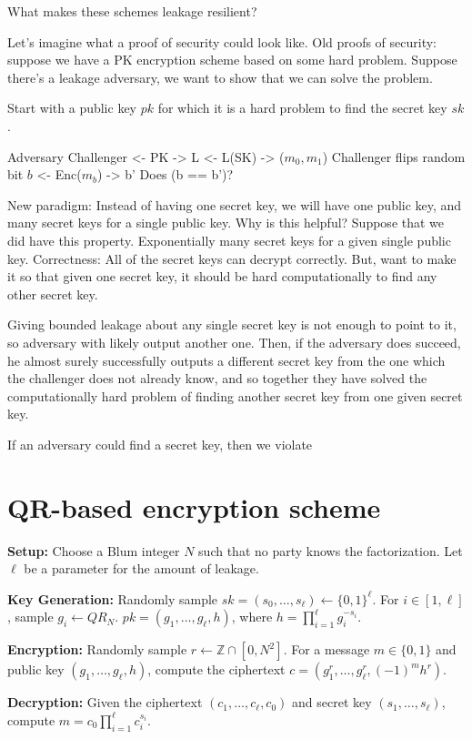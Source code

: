 \documentclass[10pt]{article}
\begin{document}
What makes these schemes leakage resilient?

Let's imagine what a proof of security could look like. Old proofs of security: suppose we have a PK encryption scheme based on some hard problem. Suppose there's a leakage adversary, we want to show that we can solve the problem.

Start with a public key $pk$ for which it is a hard problem to find the secret key $sk$.

Adversary            Challenger
<- PK
-> L
<- L(SK)
-> ($m_0, m_1$)
Challenger flips random bit $b$
<- Enc($m_b$)
-> b'
Does (b == b')?

New paradigm: Instead of having one secret key, we will have one public key, and many secret keys for a single public key. Why is this helpful? Suppose that we did have this property. Exponentially many secret keys for a given single public key. Correctness: All of the secret keys can decrypt correctly. But, want to make it so that given one secret key, it should be hard computationally to find any other secret key.

Giving bounded leakage about any single secret key is not enough to point to it, so adversary with likely output another one. Then, if the adversary does succeed, he almost surely successfully outputs a different secret key from the one which the challenger does not already know, and so together they have solved the computationally hard problem of finding another secret key from one given secret key.

If an adversary could find a secret key, then we violate

\section{QR-based encryption scheme}


\textbf{Setup:} Choose a Blum integer $N$ such that no party knows the factorization. Let $\ell$ be a parameter for the amount of leakage.

\textbf{Key Generation:} Randomly sample  $sk = (s_0,\dots,s_\ell) \leftarrow \{0,1\}^\ell$. For $i \in [1,\ell]$, sample $g_i \leftarrow QR_N$. $pk = (g_1,\dots,g_\ell,h)$, where $h = \prod_{i=1}^\ell g_i^{-s_i}$.

\textbf{Encryption:} Randomly sample $r \leftarrow \mathbb{Z} \cap [0,N^2]$. For a message $m \in \{0,1\}$ and public key $(g_1,\dots,g_\ell,h)$, compute the ciphertext $c = (g_1^r,\dots,g_\ell^r,(-1)^m h^r)$. 

\textbf{Decryption:} Given the ciphertext $(c_1,\dots,c_\ell,c_0)$ and secret key $(s_1,\dots,s_\ell)$, compute $m = c_0 \prod_{i=1}^\ell c_i^{s_i}$.
\end{document}
